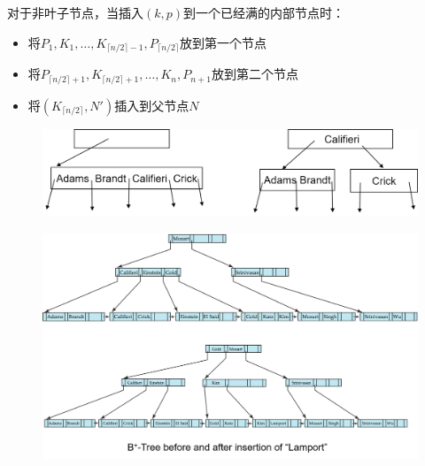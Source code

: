 对于非叶子节点，当插入$(k,p)$到一个已经满的内部节点时：
\begin{itemize}
	\item 将$P_1,K_1,\ldots,K_{\lceil n/2\rceil-1},P_{\lceil n/2\rceil}$放到第一个节点
	\item 将$P_{\lceil n/2\rceil+1},K_{\lceil n/2\rceil+1},\ldots,K_n,P_{n+1}$放到第二个节点
	\item 将$(K_{\lceil n/2\rceil},N')$插入到父节点$N$
\end{itemize}
\begin{figure}[H]
\centering
\includegraphics[width=0.6\linewidth]{fig/bp-tree_insertion3.png}
\end{figure}
\begin{figure}[H]
\centering
\includegraphics[width=0.8\linewidth]{fig/bp-tree_insertion2.png}
\end{figure}

